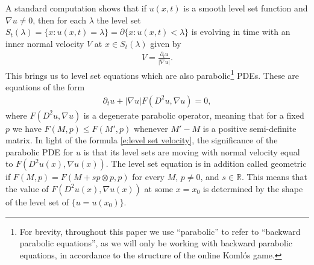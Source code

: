 \documentclass[reqno]{amsart}
\numberwithin{equation}{section}
\begin{document}
A standard computation shows that if $u(x,t)$ is a smooth level set function and $\nabla u \neq 0$,  then for each $\lambda$ the level set $S_t(\lambda) = \{ x : u(x,t) = \lambda\} = \partial \{ x: u(x,t)<\lambda \}$ is evolving in time with an inner normal velocity $V$ at $x \in S_t(\lambda)$ given by 
\begin{align}\label{e:level set velocity}
  V = \frac{\partial_t u}{|\nabla u|}.    
\end{align}
This brings us to level set equations which are also parabolic\footnote{For brevity, throughout this paper we use ``parabolic'' to refer to ``backward parabolic equations'', as we will only be working with backward parabolic equations, in accordance to the structure of the online Koml\'os game.} PDEs. These are equations of the form
 \begin{align*}
   \partial_t u + |\nabla u|F(D^2u,\nabla u) = 0,
 \end{align*}
 where $F(D^2u,\nabla u)$ is a degenerate parabolic operator, meaning that for a fixed $p$ we have $F(M,p) \leq F(M',p)$ whenever $M'-M$ is a positive semi-definite matrix.  
In light of the formula \eqref{e:level set velocity}, the significance of the parabolic PDE for $u$ is that its level sets are moving with normal velocity equal to $F(D^2u(x),\nabla u(x))$. The level set equation is in addition called geometric if $F(M,p) = F(M+s p\otimes p,p)$ for every $M$, $p\neq 0$, and $s\in\mathbb{R}$. This means that the value of $F(D^2u(x),\nabla u(x))$ at some $x=x_0$ is determined by the shape of the level set of $\{ u = u(x_0)\}$. 
\end{document}
